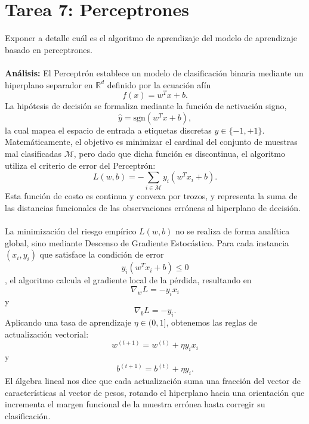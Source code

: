 \documentclass{article}
\begin{document}
\section{Tarea 7: Perceptrones}
\noindent Exponer a detalle cuál es el algoritmo de aprendizaje del modelo de aprendizaje basado en perceptrones. \\ \\
\textbf{Análisis:} El Perceptrón establece un modelo de clasificación binaria mediante un hiperplano separador en $\mathbb{R}^d$ definido por la ecuación afín \[f(x) = w^T x + b.\] La hipótesis de decisión se formaliza mediante la función de activación signo, \[\hat{y} = \text{sgn}(w^T x + b),\] la cual mapea el espacio de entrada a etiquetas discretas $y \in \{-1, +1\}$. Matemáticamente, el objetivo es minimizar el cardinal del conjunto de muestras mal clasificadas $\mathcal{M}$, pero dado que dicha función es discontinua, el algoritmo utiliza el criterio de error del Perceptrón: \[L(w, b) = -\sum_{i \in \mathcal{M}} y_i (w^T x_i + b).\] Esta función de costo es continua y convexa por trozos, y representa la suma de las distancias funcionales de las observaciones erróneas al hiperplano de decisión. \\ \\
La minimización del riesgo empírico $L(w, b)$ no se realiza de forma analítica global, sino mediante Descenso de Gradiente Estocástico. Para cada instancia $(x_i, y_i)$ que satisface la condición de error \[y_i (w^T x_i + b) \leq 0\], el algoritmo calcula el gradiente local de la pérdida, resultando en \[\nabla_w L = -y_i x_i\] y \[\nabla_b L = -y_i.\] Aplicando una tasa de aprendizaje $\eta \in (0, 1]$, obtenemos las reglas de actualización vectorial: \[w^{(t+1)} = w^{(t)} + \eta y_i x_i\] y \[b^{(t+1)} = b^{(t)} + \eta y_i.\] El álgebra lineal nos dice que cada actualización suma una fracción del vector de características al vector de pesos, rotando el hiperplano hacia una orientación que incrementa el margen funcional de la muestra errónea hasta corregir su clasificación. \\ \\
\end{document}
